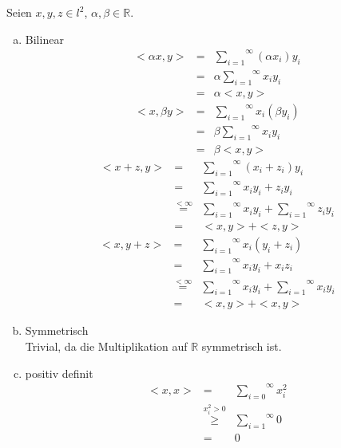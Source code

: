 Seien $x,y,z \in l^2$, $\alpha, \beta \in \mathbb{R}$.
\begin{enumerate}[a)]
    \item Bilinear\\
        $$\begin{array}{rcl}
            <\alpha x, y>   &=& \overset{\infty}{\underset{i=1}{\sum}} (\alpha x_i)y_i\\
                            &=& \alpha \overset{\infty}{\underset{i=1}{\sum}} x_i y_i\\
                            &=& \alpha < x , y>
        \end{array}$$
        $$\begin{array}{rcl}
            <x, \beta y>    &=& \overset{\infty}{\underset{i=1}{\sum}} x_i (\beta y_i)\\
                            &=& \beta \overset{\infty}{\underset{i=1}{\sum}} x_i y_i\\
                            &=& \beta < x , y>
        \end{array}$$
        $$\begin{array}{rcl}
            <x + z, y>      &=& \overset{\infty}{\underset{i=1}{\sum}} (x_i + z_i) y_i\\
                            &=& \overset{\infty}{\underset{i=1}{\sum}} x_i y_i + z_i y_i\\
                            &\stackrel{< \infty}{=} & \overset{\infty}{\underset{i=1}{\sum}} x_i y_i + \overset{\infty}{\underset{i=1}{\sum}} z_i y_i\\
                            &=& < x , y> + <z , y>
        \end{array}$$
        $$\begin{array}{rcl}
            <x , y + z>     &=& \overset{\infty}{\underset{i=1}{\sum}} x_i (y_i + z_i)\\
                            &=& \overset{\infty}{\underset{i=1}{\sum}} x_i y_i + x_i z_i\\
                            &\stackrel{< \infty}{=} & \overset{\infty}{\underset{i=1}{\sum}} x_i y_i + \overset{\infty}{\underset{i=1}{\sum}} x_i y_i\\
                            &=& < x , y> + <x , y>
        \end{array}$$
    \item Symmetrisch\\
        Trivial, da die Multiplikation auf $\mathbb{R}$ symmetrisch ist.
    \item positiv definit\\
        $$\begin{array}{rcl}
            <x,x>   &=& \overset{\infty}{\underset{i=0}{\sum}} x_i^2\\
                    &\stackrel{x_i^2 > 0}{\geq}& \overset{\infty}{\underset{i = 1}{\sum}} 0\\
                    &=& 0
        \end{array}$$
\end{enumerate}

